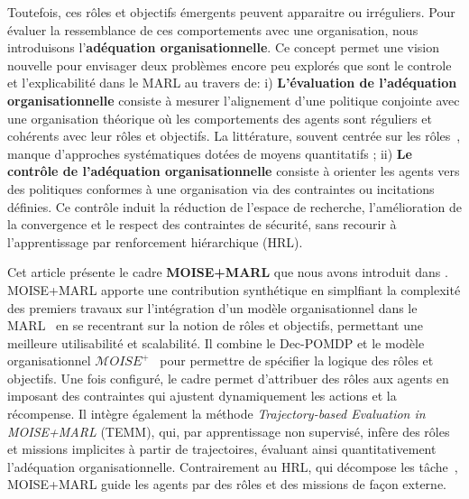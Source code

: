 \documentclass[dissemination]{jfsma}
\begin{document}
Toutefois, ces rôles et objectifs émergents peuvent apparaitre  ou irréguliers. Pour évaluer la ressemblance de ces comportements avec une organisation, nous introduisons l'\textbf{adéquation organisationnelle}. Ce concept permet une vision nouvelle pour envisager deux problèmes encore peu explorés que sont le controle et l'explicabilité dans le MARL au travers de:
i) \textbf{L'évaluation de l'adéquation organisationnelle} consiste à mesurer l'alignement d'une politique conjointe avec une organisation théorique où les comportements des agents sont réguliers et cohérents avec leur rôles et objectifs. La littérature, souvent centrée sur les rôles~\cite{Isakov2024, Wen2024, Xie2024}, manque d'approches systématiques dotées de moyens quantitatifs
 ; \quad
ii) \textbf{Le contrôle de l'adéquation organisationnelle} consiste à orienter les agents vers des politiques conformes à une organisation via des contraintes ou incitations définies. Ce contrôle induit la réduction de l'espace de recherche, l'amélioration de la convergence et le respect des contraintes de sécurité, sans recourir à l'apprentissage par renforcement hiérarchique (HRL).


\noindent Cet article présente le cadre \textbf{MOISE+MARL} que nous avons introduit dans \cite{soule2025moisemarl}. MOISE+MARL apporte une contribution synthétique en simplfiant la complexité des premiers travaux sur l'intégration d'un modèle organisationnel dans le MARL~\cite{soule2024paper-jfsma, soule2024aomea} en se recentrant sur la notion de rôles et objectifs, permettant une meilleure utilisabilité et scalabilité. Il combine le Dec-POMDP et le modèle organisationnel $\mathcal{M}OISE^+$~\cite{Hubner2007} pour permettre de spécifier la logique des rôles et objectifs. Une fois configuré, le cadre permet d'attribuer des rôles aux agents en imposant des contraintes qui ajustent dynamiquement les actions et la récompense. Il intègre également la méthode \textit{Trajectory-based Evaluation in MOISE+MARL} (TEMM), qui, par apprentissage non supervisé, infère des rôles et missions implicites à partir de trajectoires, évaluant ainsi quantitativement l'adéquation organisationnelle. Contrairement au HRL, qui décompose les tâche~\cite{Qi2024, Matsuyama2025, SaoMai2024}, MOISE+MARL guide les agents par des rôles et des missions de façon externe.
\end{document}
